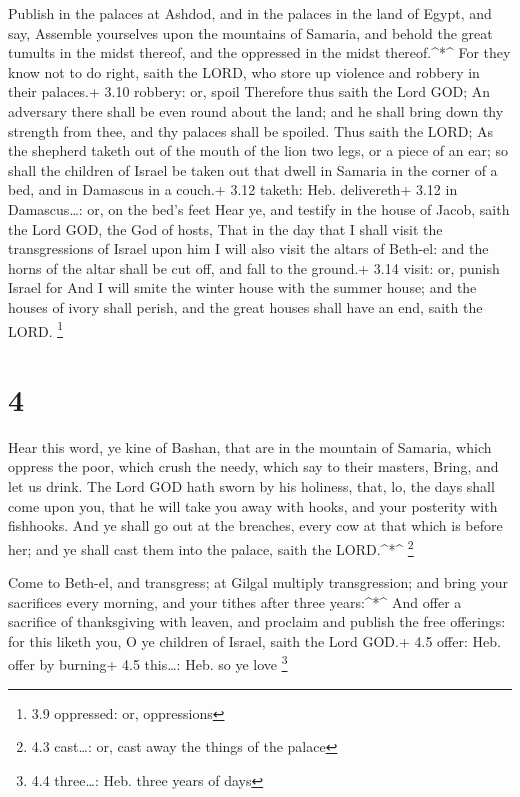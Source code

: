  Publish in the palaces at Ashdod, and in the palaces in the
land of Egypt, and say, Assemble yourselves upon the mountains of
Samaria, and behold the great tumults in the midst thereof, and the
oppressed in the midst thereof.\^{}*\^{}  For they know not
to do right, saith the LORD, who store up violence and robbery in their
palaces.+ 3.10 robbery: or, spoil  Therefore thus saith the
Lord GOD; An adversary there shall be even round about the land; and he
shall bring down thy strength from thee, and thy palaces shall be
spoiled.  Thus saith the LORD; As the shepherd taketh out
of the mouth of the lion two legs, or a piece of an ear; so shall the
children of Israel be taken out that dwell in Samaria in the corner of a
bed, and in Damascus in a couch.+ 3.12 taketh: Heb. delivereth+ 3.12 in
Damascus\ldots: or, on the bed's feet  Hear ye, and testify
in the house of Jacob, saith the Lord GOD, the God of hosts,
 That in the day that I shall visit the transgressions of
Israel upon him I will also visit the altars of Beth-el: and the horns
of the altar shall be cut off, and fall to the ground.+ 3.14 visit: or,
punish Israel for  And I will smite the winter house with
the summer house; and the houses of ivory shall perish, and the great
houses shall have an end, saith the LORD. \footnote{3.9 oppressed: or,
  oppressions}

\hypertarget{section-3}{%
\section{4}\label{section-3}}

 Hear this word, ye kine of Bashan, that are in the mountain
of Samaria, which oppress the poor, which crush the needy, which say to
their masters, Bring, and let us drink.  The Lord GOD hath
sworn by his holiness, that, lo, the days shall come upon you, that he
will take you away with hooks, and your posterity with fishhooks.
 And ye shall go out at the breaches, every cow at that
which is before her; and ye shall cast them into the palace, saith the
LORD.\^{}*\^{} \footnote{4.3 cast\ldots: or, cast away the things of the
  palace}

 Come to Beth-el, and transgress; at Gilgal multiply
transgression; and bring your sacrifices every morning, and your tithes
after three years:\^{}*\^{}  And offer a sacrifice of
thanksgiving with leaven, and proclaim and publish the free offerings:
for this liketh you, O ye children of Israel, saith the Lord GOD.+ 4.5
offer: Heb. offer by burning+ 4.5 this\ldots: Heb. so ye love
\footnote{4.4 three\ldots: Heb. three years of days}

